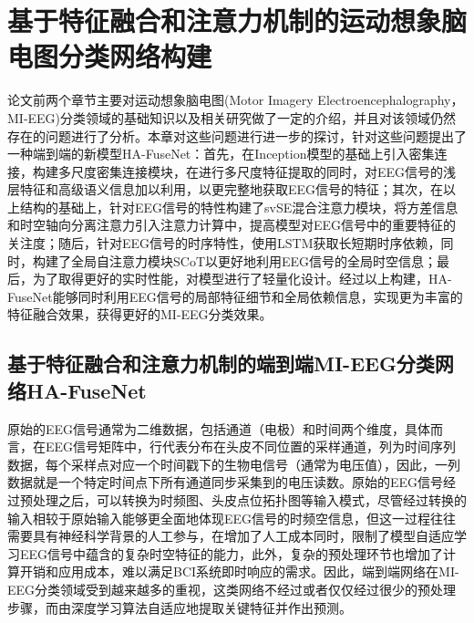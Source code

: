 
\chapter{基于特征融合和注意力机制的运动想象脑电图分类网络构建}

论文前两个章节主要对运动想象脑电图(Motor Imagery Electroencephalography，MI-EEG)分类领域的基础知识以及相关研究做了一定的介绍，并且对该领域仍然存在的问题进行了分析。本章对这些问题进行进一步的探讨，针对这些问题提出了一种端到端的新模型HA-FuseNet：首先，在Inception模型的基础上引入密集连接，构建多尺度密集连接模块，在进行多尺度特征提取的同时，对EEG信号的浅层特征和高级语义信息加以利用，以更完整地获取EEG信号的特征；其次，在以上结构的基础上，针对EEG信号的特性构建了svSE混合注意力模块，将方差信息和时空轴向分离注意力引入注意力计算中，提高模型对EEG信号中的重要特征的关注度；随后，针对EEG信号的时序特性，使用LSTM获取长短期时序依赖，同时，构建了全局自注意力模块SCoT以更好地利用EEG信号的全局时空信息；最后，为了取得更好的实时性能，对模型进行了轻量化设计。经过以上构建，HA-FuseNet能够同时利用EEG信号的局部特征细节和全局依赖信息，实现更为丰富的特征融合效果，获得更好的MI-EEG分类效果。

\section{基于特征融合和注意力机制的端到端MI-EEG分类网络HA-FuseNet}

原始的EEG信号通常为二维数据，包括通道（电极）和时间两个维度，具体而言，在EEG信号矩阵中，行代表分布在头皮不同位置的采样通道，列为时间序列数据，每个采样点对应一个时间戳下的生物电信号（通常为电压值），因此，一列数据就是一个特定时间点下所有通道同步采集到的电压读数。原始的EEG信号经过预处理之后，可以转换为时频图、头皮点位拓扑图等输入模式，尽管经过转换的输入相较于原始输入能够更全面地体现EEG信号的时频空信息，但这一过程往往需要具有神经科学背景的人工参与，在增加了人工成本同时，限制了模型自适应学习EEG信号中蕴含的复杂时空特征的能力，此外，复杂的预处理环节也增加了计算开销和应用成本，难以满足BCI系统即时响应的需求。因此，端到端网络在MI-EEG分类领域受到越来越多的重视，这类网络不经过或者仅仅经过很少的预处理步骤，而由深度学习算法自适应地提取关键特征并作出预测。

